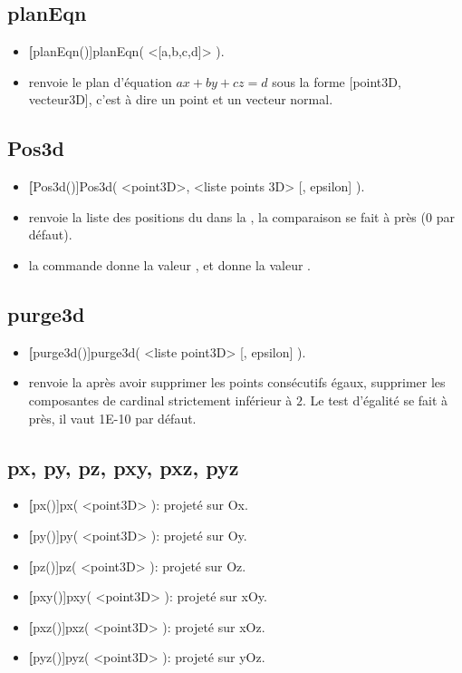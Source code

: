 \subsection{planEqn}
\begin{itemize}
 \item \util \textbf[planEqn()]{planEqn( <[a,b,c,d]> )}.
 \item \desc renvoie le plan d'équation $ax+by+cz=d$ sous la forme [point3D, vecteur3D], c'est à dire un point et un
vecteur normal.
\end{itemize}


\subsection{Pos3d}
\begin{itemize}
 \item \util \textbf[Pos3d()]{Pos3d( <point3D>, <liste points 3D> [, epsilon] )}.
 \item \desc renvoie la liste des positions du  dans la , la comparaison se fait à  près ($0$ par défaut).
 \item \exem la commande  donne la valeur , et  donne la valeur .
\end{itemize}

\subsection{purge3d}
\begin{itemize}
 \item \util \textbf[purge3d()]{purge3d( <liste point3D> [, epsilon] )}.
 \item \desc renvoie la  après avoir supprimer les points consécutifs égaux, supprimer les composantes de cardinal strictement inférieur à $2$. Le test d'égalité se fait à  près, il vaut 1E-10 par défaut.
\end{itemize}


\subsection{px, py, pz, pxy, pxz, pyz} 

\begin{itemize}
 \item \textbf[px()]{px( <point3D> )}: projeté sur Ox.
 \item \textbf[py()]{py( <point3D> )}: projeté sur Oy.
 \item \textbf[pz()]{pz( <point3D> )}: projeté sur Oz.
 \item \textbf[pxy()]{pxy( <point3D> )}: projeté sur xOy.
 \item \textbf[pxz()]{pxz( <point3D> )}: projeté sur xOz.
 \item \textbf[pyz()]{pyz( <point3D> )}: projeté sur yOz.
\end{itemize}

